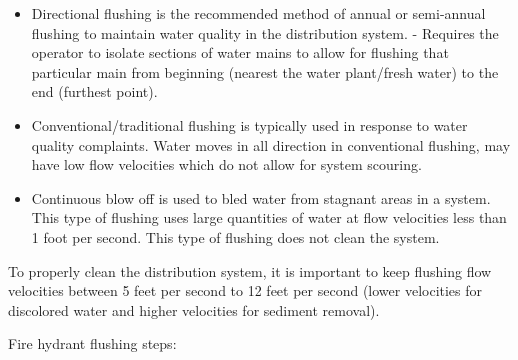 \documentclass[10pt]{article}
\begin{document}
\begin{itemize}
  \item Directional flushing is the recommended method of annual or semi-annual flushing to maintain water quality in the distribution system. - Requires the operator to isolate sections of water mains to allow for flushing that particular main from beginning (nearest the water plant/fresh water) to the end (furthest point).

  \item Conventional/traditional flushing is typically used in response to water quality complaints. Water moves in all direction in conventional flushing, may have low flow velocities which do not allow for system scouring.

  \item Continuous blow off is used to bled water from stagnant areas in a system. This type of flushing uses large quantities of water at flow velocities less than 1 foot per second. This type of flushing does not clean the system.

\end{itemize}
To properly clean the distribution system, it is important to keep flushing flow velocities between 5 feet per second to 12 feet per second (lower velocities for discolored water and higher velocities for sediment removal).

Fire hydrant flushing steps:
\end{document}
